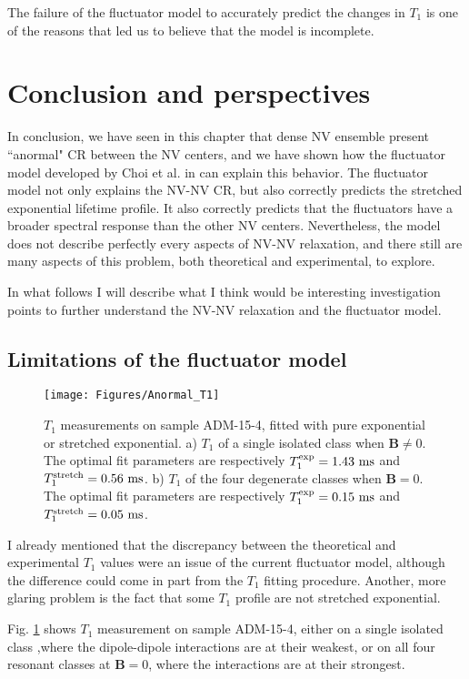 \documentclass[a4paper,11pt]{report}
\begin{document}
The failure of the fluctuator model to accurately predict the changes in $T_1$ is one of the reasons that led us to believe that the model is incomplete.

\section{Conclusion and perspectives}

In conclusion, we have seen in this chapter that dense NV ensemble present ``anormal" CR between the NV centers, and we have shown how the fluctuator model developed by Choi et al. in \citep{choi2017depolarization} can explain this behavior. The fluctuator model not only explains the NV-NV CR, but also correctly predicts the stretched exponential lifetime profile. It also correctly predicts that the fluctuators have a broader spectral response than the other NV centers. Nevertheless, the model does not describe perfectly every aspects of NV-NV relaxation, and there still are many aspects of this problem, both theoretical and experimental, to explore.

In what follows I will describe what I think would be interesting investigation points to further understand the NV-NV relaxation and the fluctuator model.

\subsection{Limitations of the fluctuator model}
\begin{figure}[h]
\centering
\texttt{[image: Figures/Anormal\_T1]}
\caption{$T_1$ measurements on sample ADM-15-4, fitted with pure exponential or stretched exponential. a) $T_1$ of a single isolated class when $\mathbf{B} \neq 0$. The optimal fit parameters are respectively $T_1^{\rm exp}=1.43\ \rm ms$ and $T_1^{\rm stretch}=0.56\ \rm ms$. b) $T_1$ of the four degenerate classes when $\mathbf{B}=0$. The optimal fit parameters are respectively $T_1^{\rm exp}=0.15\ \rm ms$ and $T_1^{\rm stretch}=0.05\ \rm ms$.}
\label{anormal T1}
\end{figure}

I already mentioned that the discrepancy between the theoretical and experimental $T_1$  values were an issue of the current fluctuator model, although the difference could come in part from the $T_1$ fitting procedure. Another, more glaring problem is the fact that some $T_1$ profile are not stretched exponential.

Fig. \ref{anormal T1} shows $T_1$ measurement on sample ADM-15-4, either on a single isolated class ,where the dipole-dipole interactions are at their weakest, or on all four resonant classes at $\mathbf{B}=0$, where the interactions are at their strongest.
\end{document}
